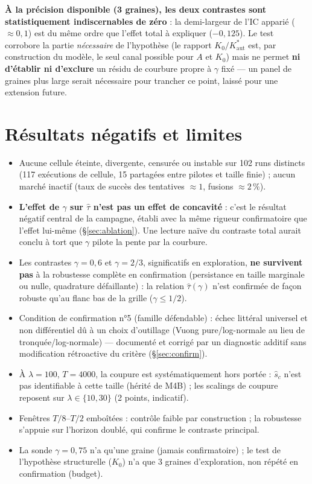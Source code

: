 \documentclass[11pt,a4paper]{article}
\newcommand{\Kaut}{K^{*}_{\mathrm{aut}}}
\begin{document}
\textbf{À la précision disponible (3 graines), les deux contrastes sont
statistiquement indiscernables de zéro} : la demi-largeur de l'IC
apparié ($\approx0{,}1$) est du même ordre que l'effet total à expliquer
($-0{,}125$). Le test corrobore la partie \emph{nécessaire} de
l'hypothèse (le rapport $K_0/\Kaut$ est, par construction du modèle, le
seul canal possible pour $A$ et $K_0$) mais ne permet \textbf{ni
d'établir ni d'exclure} un résidu de courbure propre à $\gamma$ fixé ---
un panel de graines plus large serait nécessaire pour trancher ce point,
laissé pour une extension future.

\section{Résultats négatifs et limites}

\begin{itemize}
\item Aucune cellule éteinte, divergente, censurée ou instable sur
102 runs distincts (117 exécutions de cellule, 15 partagées entre
pilotes et taille finie) ; aucun marché inactif (taux de succès des tentatives
$\approx1$, fusions $\approx2\,\%$).
\item \textbf{L'effet de $\gamma$ sur $\hat\tau$ n'est pas un effet de
concavité} : c'est le résultat négatif central de la campagne, établi
avec la même rigueur confirmatoire que l'effet lui-même
(\S\ref{sec:ablation}). Une lecture naïve du contraste total aurait
conclu à tort que $\gamma$ \og pilote la pente \fg{} par la courbure.
\item Les contrastes $\gamma=0{,}6$ et $\gamma=2/3$, significatifs en
exploration, \textbf{ne survivent pas} à la robustesse complète en
confirmation (persistance en taille marginale ou nulle, quadrature
défaillante) : la relation $\hat\tau(\gamma)$ n'est confirmée de façon
robuste qu'au flanc bas de la grille ($\gamma\le1/2$).
\item Condition de confirmation n°5 (famille défendable) : échec
littéral universel et non différentiel dû à un choix d'outillage
(Vuong pure/log-normale au lieu de tronquée/log-normale) --- documenté
et corrigé par un diagnostic additif sans modification rétroactive du
critère (\S\ref{sec:confirm}).
\item À $\lambda=100$, $T=4000$, la coupure est systématiquement hors
portée : $\hat s_c$ n'est pas identifiable à cette taille (hérité de
M4B) ; les scalings de coupure reposent sur $\lambda\in\{10,30\}$
(2 points, indicatif).
\item Fenêtres $T/8$--$T/2$ emboîtées : contrôle faible par
construction ; la robustesse s'appuie sur l'horizon doublé, qui confirme
le contraste principal.
\item La sonde $\gamma=0{,}75$ n'a qu'une graine (jamais confirmatoire) ;
le test de l'hypothèse structurelle ($K_0$) n'a que 3 graines
d'exploration, non répété en confirmation (budget).
\end{itemize}


\end{document}
